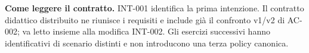 \noindent\textbf{Come leggere il contratto.} \mbox{INT-001} identifica la prima intenzione. Il contratto didattico distribuito ne riunisce i requisiti e include già il confronto v1/v2 di \mbox{AC-002}; va letto insieme alla modifica \mbox{INT-002}. Gli esercizi successivi hanno identificativi di scenario distinti e non introducono una terza policy canonica.
\endgroup
\clearpage
